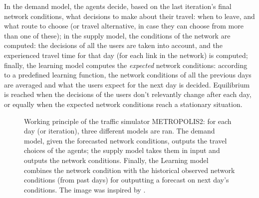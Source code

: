 In the demand model, the agents decide,
based on the last iteration's final network conditions,
what decisions to make about their travel:
when to leave, and what route to choose (or travel alternative, in case they can choose from more than one of these);
in the supply model, the conditions of the network are computed:
the decisions of all the users are taken into account, and the experienced travel time for that day
(for each link in the network) is computed;
finally, the learning model computes the \textit{expected} network conditions:
according to a predefined learning function,
the network conditions of all the previous days are averaged and what the users expect for the next day is decided.
Equilibrium is reached when the decisions of the users don't relevantly change after each day,
or equally when the expected network conditions reach a stationary situation.
\begin{figure}
  \centering
  \caption{Working principle of the traffic simulator METROPOLIS2:
    for each day (or iteration), three different models are ran.
    The demand model, given the forecasted network conditions, outputs the travel choices of the agents;
    the supply model takes them in input and outputs the network conditions.
    Finally, the Learning model combines the network condition with the historical observed network conditions (from past days) for outputting a forecast on next day's conditions.
  The image was inspired by \textcite{RePEc:ema:worpap:2024-03}.}
  \label{fig:metr_func}
\end{figure}

